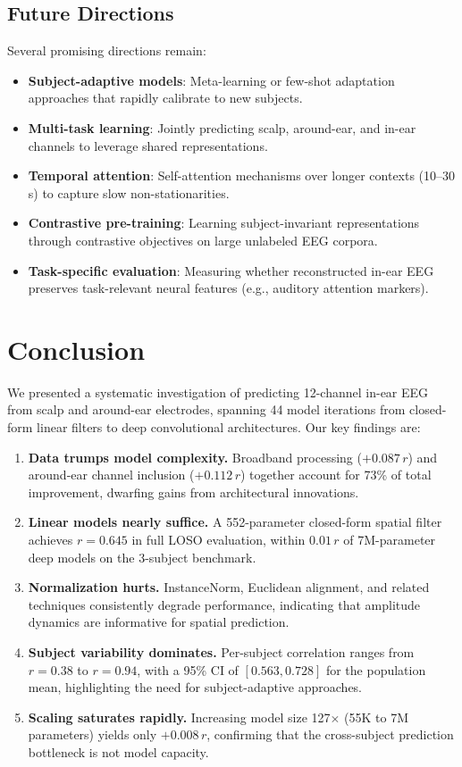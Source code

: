 \documentclass[conference]{IEEEtran}
\begin{document}
\subsection{Future Directions}

Several promising directions remain:
\begin{itemize}
    \item \textbf{Subject-adaptive models}: Meta-learning or few-shot adaptation approaches that rapidly calibrate to new subjects.
    \item \textbf{Multi-task learning}: Jointly predicting scalp, around-ear, and in-ear channels to leverage shared representations.
    \item \textbf{Temporal attention}: Self-attention mechanisms over longer contexts (10--30\,s) to capture slow non-stationarities.
    \item \textbf{Contrastive pre-training}: Learning subject-invariant representations through contrastive objectives on large unlabeled EEG corpora.
    \item \textbf{Task-specific evaluation}: Measuring whether reconstructed in-ear EEG preserves task-relevant neural features (e.g., auditory attention markers).
\end{itemize}

\section{Conclusion}
\label{sec:conclusion}

We presented a systematic investigation of predicting 12-channel in-ear EEG from scalp and around-ear electrodes, spanning 44 model iterations from closed-form linear filters to deep convolutional architectures. Our key findings are:

\begin{enumerate}
    \item \textbf{Data trumps model complexity.} Broadband processing ($+0.087\,r$) and around-ear channel inclusion ($+0.112\,r$) together account for 73\% of total improvement, dwarfing gains from architectural innovations.
    \item \textbf{Linear models nearly suffice.} A 552-parameter closed-form spatial filter achieves $r = 0.645$ in full LOSO evaluation, within $0.01\,r$ of 7M-parameter deep models on the 3-subject benchmark.
    \item \textbf{Normalization hurts.} InstanceNorm, Euclidean alignment, and related techniques consistently degrade performance, indicating that amplitude dynamics are informative for spatial prediction.
    \item \textbf{Subject variability dominates.} Per-subject correlation ranges from $r = 0.38$ to $r = 0.94$, with a 95\% CI of $[0.563, 0.728]$ for the population mean, highlighting the need for subject-adaptive approaches.
    \item \textbf{Scaling saturates rapidly.} Increasing model size 127$\times$ (55K to 7M parameters) yields only $+0.008\,r$, confirming that the cross-subject prediction bottleneck is not model capacity.
\end{enumerate}
\end{document}
